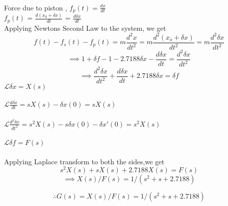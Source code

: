\documentclass{article}
\begin{document}
\newline\\
Force due to piston , $f_p(t) = \frac{dx}{dt}$ \\
\implies $f_p(t)$ = $\frac{d(x_0 +\delta x)}{dt} $ = $\frac{d\delta x}{dt}$\\ 
Applying Newtons Second Law to the system, we get\\
\[f(t) - f_s(t) -f_p(t) = m\frac{d^2x}{dt^2} =m\frac{d^2(x_o + \delta x)}{dt^2} = m\frac{d^2\delta x}{dt^2}\]
\[\implies 1 + \delta f  -1 - 2.7188\delta x - \frac{d\delta x}{dt} = \frac{d^2\delta x}{dt^2} \]
\[\implies \frac{d^2\delta x}{dt^2} + \frac{d\delta x}{dt} +2.7188\delta x = \delta f   \]
$\mathcal{L}\delta x  = X(s)$\\ \\
$\mathcal{L}{\frac{d\delta x}{dt}} = sX(s) -\delta x(0) = sX(s)$\\ \\ 
$\mathcal{L}{{\frac{d^2\delta x}{dt^2} }}  = s^2X(s) - s\delta x(0) -\delta x'(0) =s^2X (s)$\\ \\
$\mathcal{L}\delta f = F(s)$\\\\



Applying Laplace transform to both the sides,we get
\[s^2X(s) +sX(s) +2.7188X(s) = F(s)\]
\[\implies X(s)/F(s) = 1/(s^2 +s + 2.7188) \]

\[\therefore G(s) =X(s)/F(s) = 1/(s^2 +s +2.7188)\]
\end{document}
